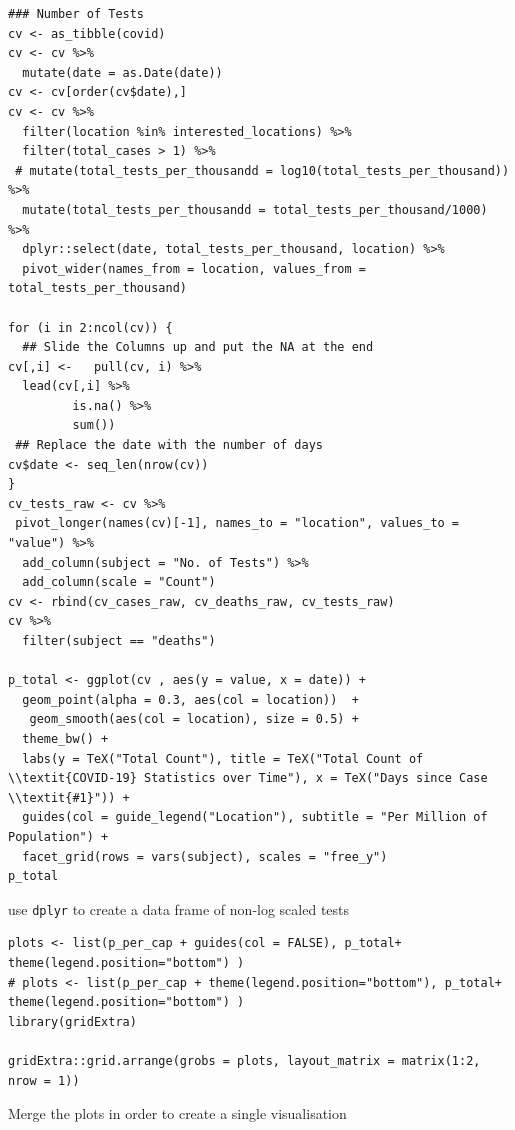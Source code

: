 \documentclass[11pt]{article}
\begin{document}
\begin{listing}[htbp]
\begin{verbatim}
### Number of Tests
cv <- as_tibble(covid)
cv <- cv %>%
  mutate(date = as.Date(date))
cv <- cv[order(cv$date),]
cv <- cv %>%
  filter(location %in% interested_locations) %>%
  filter(total_cases > 1) %>%
 # mutate(total_tests_per_thousandd = log10(total_tests_per_thousand)) %>%
  mutate(total_tests_per_thousandd = total_tests_per_thousand/1000) %>%
  dplyr::select(date, total_tests_per_thousand, location) %>%
  pivot_wider(names_from = location, values_from = total_tests_per_thousand)

for (i in 2:ncol(cv)) {
  ## Slide the Columns up and put the NA at the end
cv[,i] <-   pull(cv, i) %>%
  lead(cv[,i] %>%
         is.na() %>%
         sum())
 ## Replace the date with the number of days
cv$date <- seq_len(nrow(cv))
}
cv_tests_raw <- cv %>%
 pivot_longer(names(cv)[-1], names_to = "location", values_to = "value") %>%
  add_column(subject = "No. of Tests") %>%
  add_column(scale = "Count")
cv <- rbind(cv_cases_raw, cv_deaths_raw, cv_tests_raw)
cv %>%
  filter(subject == "deaths")

p_total <- ggplot(cv , aes(y = value, x = date)) +
  geom_point(alpha = 0.3, aes(col = location))  +
   geom_smooth(aes(col = location), size = 0.5) +
  theme_bw() +
  labs(y = TeX("Total Count"), title = TeX("Total Count of \\textit{COVID-19} Statistics over Time"), x = TeX("Days since Case \\textit{#1}")) +
  guides(col = guide_legend("Location"), subtitle = "Per Million of Population") +
  facet_grid(rows = vars(subject), scales = "free_y")
p_total
\end{verbatim}
\caption{\label{org4c22a85}use \texttt{dplyr} to create a data frame of non-log scaled tests}
\end{listing}

\begin{listing}[htbp]
\begin{verbatim}
plots <- list(p_per_cap + guides(col = FALSE), p_total+ theme(legend.position="bottom") )
# plots <- list(p_per_cap + theme(legend.position="bottom"), p_total+ theme(legend.position="bottom") )
library(gridExtra)

gridExtra::grid.arrange(grobs = plots, layout_matrix = matrix(1:2, nrow = 1))
\end{verbatim}
\caption{\label{org58d5812}Merge the plots in order to create a single visualisation}
\end{listing}
\end{document}
